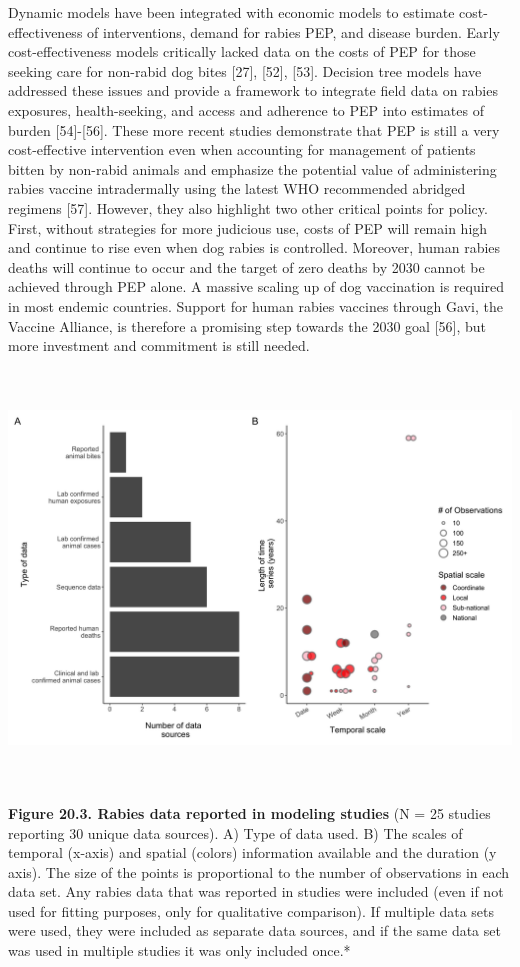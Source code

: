 \documentclass[
]{book}
\begin{document}
Dynamic models have been integrated with economic models to estimate
cost-effectiveness of interventions, demand for rabies PEP, and disease
burden. Early cost-effectiveness models critically lacked data on the
costs of PEP for those seeking care for non-rabid dog bites {[}27{]},
{[}52{]}, {[}53{]}. Decision tree models have addressed these issues and
provide a framework to integrate field data on rabies exposures,
health-seeking, and access and adherence to PEP into estimates of burden
{[}54{]}-{[}56{]}. These more recent studies demonstrate that PEP is still a
very cost-effective intervention even when accounting for management of
patients bitten by non-rabid animals and emphasize the potential value
of administering rabies vaccine intradermally using the latest WHO
recommended abridged regimens {[}57{]}. However, they also highlight two
other critical points for policy. First, without strategies for more
judicious use, costs of PEP will remain high and continue to rise even
when dog rabies is controlled. Moreover, human rabies deaths will
continue to occur and the target of zero deaths by 2030 cannot be
achieved through PEP alone. A massive scaling up of dog vaccination is
required in most endemic countries. Support for human rabies vaccines
through Gavi, the Vaccine Alliance, is therefore a promising step
towards the 2030 goal {[}56{]}, but more investment and commitment is
still needed.

\includegraphics[width=6.49451in,height=4.32967in]{figs/ch3/image3.jpeg}

\textbf{Figure 20.3. Rabies data reported in modeling studies} (N = 25
studies reporting 30 unique data sources). A) Type of data used. B)
The scales of temporal (x-axis) and spatial (colors) information
available and the duration (y axis). The size of the points is
proportional to the number of observations in each data set. Any rabies
data that was reported in studies were included (even if not used for
fitting purposes, only for qualitative comparison). If multiple data
sets were used, they were included as separate data sources, and if the
same data set was used in multiple studies it was only included once.*
\end{document}
